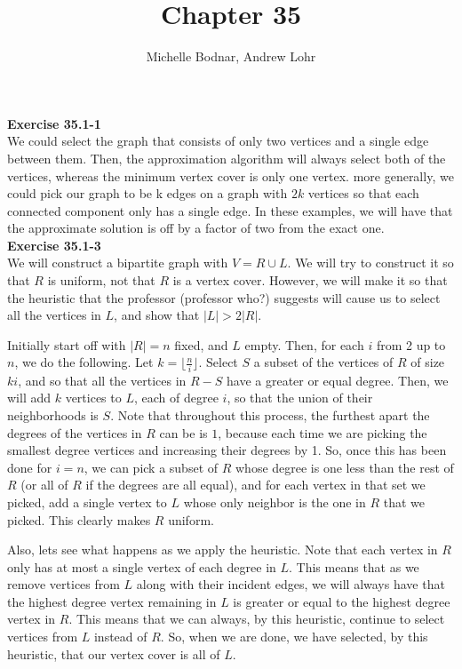 \documentclass{article}
\title{Chapter 35}
\author{Michelle Bodnar, Andrew Lohr}
\begin{document}
\maketitle

\noindent\textbf{Exercise 35.1-1}\\

We could select the graph that consists of only two vertices and a single edge between them. Then, the approximation algorithm will always select both of the vertices, whereas the minimum vertex cover is only one vertex. more generally, we could pick our graph to be k edges on a graph with $2k$ vertices so that each connected component only has a single edge. In these examples, we will have that the approximate solution is off by a factor of two from the exact one.\\



\noindent\textbf{Exercise 35.1-3}\\

We will construct a bipartite graph with $V = R \cup L$. We will try to construct it so that $R$ is uniform, not that $R$ is a vertex cover. However, we will make it so that the heuristic that the professor (professor who?) suggests will cause us to select all the vertices in $L$, and show that $|L| > 2|R|$.

Initially start off with $|R|=n$ fixed, and $L$ empty. Then, for each $i$ from 2 up to $n$, we do the following. Let $k = \lfloor \frac{n}{i}\rfloor$. Select $S$ a subset of the vertices of $R$ of size $ki$, and so that all the vertices in $R-S$ have a greater or equal degree. Then, we will add $k$ vertices to $L$, each of degree $i$, so that the union of their neighborhoods is $S$. Note that throughout this process, the furthest apart the degrees of the vertices in $R$ can be is $1$, because each time we are picking the smallest degree vertices and increasing their degrees by 1. So, once this has been done for $i=n$, we can pick a subset of $R$ whose degree is one less than the rest of $R$ (or all of $R$ if the degrees are all equal), and for each vertex in that set we picked, add a single vertex to $L$ whose only neighbor is the one in $R$ that we picked. This clearly makes $R$ uniform.

Also, lets see what happens as we apply the heuristic. Note that each vertex in $R$ only has at most a single vertex of each degree in $L$. This means that as we remove vertices from $L$ along with their incident edges, we will always have that the highest degree vertex remaining in $L$ is greater or equal to the highest degree vertex in $R$. This means that we can always, by this heuristic, continue to select vertices from $L$ instead of $R$. So, when we are done, we have selected, by this heuristic, that our vertex cover is all of $L$. 
\end{document}
